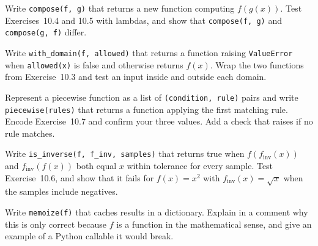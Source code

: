 \begin{codeexercises}
\item Write \lstinline!compose(f, g)! that returns a new function computing $f(g(x))$. Test Exercises~10.4 and 10.5 with lambdas, and show that \lstinline!compose(f, g)! and \lstinline!compose(g, f)! differ.
\item Write \lstinline!with_domain(f, allowed)! that returns a function raising \lstinline!ValueError! when \lstinline!allowed(x)! is false and otherwise returns $f(x)$. Wrap the two functions from Exercise~10.3 and test an input inside and outside each domain.
\item Represent a piecewise function as a list of \lstinline!(condition, rule)! pairs and write \lstinline!piecewise(rules)! that returns a function applying the first matching rule. Encode Exercise~10.7 and confirm your three values. Add a check that raises if no rule matches.
\item Write \lstinline!is_inverse(f, f_inv, samples)! that returns true when $f(f_{\text{inv}}(x))$ and $f_{\text{inv}}(f(x))$ both equal $x$ within tolerance for every sample. Test Exercise~10.6, and show that it fails for $f(x) = x^2$ with $f_{\text{inv}}(x) = \sqrt{x}$ when the samples include negatives.
\item Write \lstinline!memoize(f)! that caches results in a dictionary. Explain in a comment why this is only correct because $f$ is a function in the mathematical sense, and give an example of a Python callable it would break.
\end{codeexercises}
